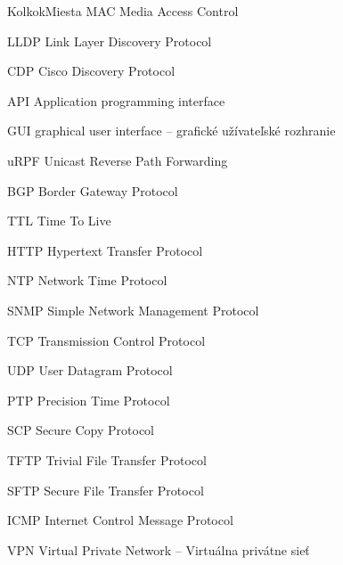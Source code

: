 \begin{seznamzkratek}{KolkokMiesta}
	{MAC} %
	{Media Access Control} %
	
	{LLDP} %
	{Link Layer Discovery Protocol} %
	
	{CDP} %
	{Cisco Discovery Protocol} %

	{API} %
	{Application programming interface} %
	
	{GUI} %
	{graphical user interface -- grafické užívateľské rozhranie} %
	
	{uRPF} %
	{Unicast Reverse Path Forwarding} %
	
	{BGP} %
	{Border Gateway Protocol} %
	
	{TTL} %
	{Time To Live} %
	
	{HTTP} %
	{Hypertext Transfer Protocol} %
	
	{NTP} %
	{Network Time Protocol} %
	
	{SNMP} %
	{Simple Network Management Protocol} %
	
	{TCP} %
	{Transmission Control Protocol} %

	{UDP} %
	{User Datagram Protocol} %
	
	{PTP} %
	{Precision Time Protocol} %

	{SCP} %
	{Secure Copy Protocol} %
	
	{TFTP} %
	{Trivial File Transfer Protocol} %
	
	{SFTP} %
	{Secure File Transfer Protocol} %
	
	{ICMP} %
	{Internet Control Message Protocol} %
	
	{VPN} %
	{Virtual Private Network -- Virtuálna privátne sieť} %
	

\end{seznamzkratek}
